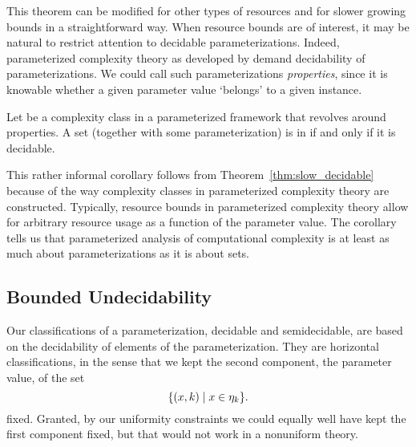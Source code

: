 This theorem can be modified for other types of resources and for slower growing bounds in a straightforward way.
When resource bounds are of interest, it may be natural to restrict attention to decidable parameterizations.
Indeed, parameterized complexity theory as developed by \textcite{flum2006parameterized} demand decidability of parameterizations.
We could call such parameterizations \emph{properties}, since it is knowable whether a given parameter value `belongs' to a given instance.
\begin{corollary}
\label{cor:decidable}
  Let  be a complexity class in a parameterized framework that revolves around properties.
  A set (together with some parameterization) is in  if and only if it is decidable.
\end{corollary}
This rather informal corollary follows from Theorem~\ref{thm:slow_decidable} because of the way complexity classes in parameterized complexity theory are constructed.
Typically, resource bounds in parameterized complexity theory allow for arbitrary resource usage as a function of the parameter value.
The corollary tells us that parameterized analysis of computational complexity is at least as much about parameterizations as it is about sets.

\subsection{Bounded Undecidability}
Our classifications of a parameterization, decidable and semidecidable, are based on the decidability of elements of the parameterization.
They are horizontal classifications, in the sense that we kept the second component, the parameter value, of the set
\begin{equation*}
  \{(x, k) \;{|}\; x \in \eta_k\}.
\end{equation*}
fixed.
Granted, by our uniformity constraints we could equally well have kept the first component fixed, but that would not work in a nonuniform theory.


